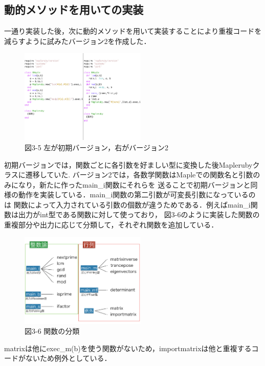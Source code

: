 \subsection{動的メソッドを用いての実装}
一通り実装した後，次に動的メソッドを用いて実装することにより重複コードを減らすように試みたバージョン2を作成した．

\begin{figure}[htbp]\begin{center}
\includegraphics[width=6cm,bb=0 0 442 500]{../figs/./mapleruby_eringi.007.png}
\caption{図3-5 左が初期バージョン，右がバージョン2}
\label{default}\end{center}\end{figure}
初期バージョンでは，関数ごとに各引数を好ましい型に変換した後Maplerubyクラスに遷移していた.
バージョン2では，各数学関数はMapleでの関数名と引数のみになり，新たに作ったmain\_i関数にそれらを
送ることで初期バージョンと同様の動作を実装している．main\_i関数の第二引数が可変長引数になっているのは
関数によって入力されている引数の個数が違うためである．例えばmain\_i関数は出力がint型である関数に対して使っており，
図3-6のように実装した関数の重複部分や出力に応じて分類して，それぞれ関数を追加している．

\begin{figure}[htbp]\begin{center}
\includegraphics[width=6cm,bb=0 0 442 500]{../figs/./mapleruby_eringi.008.png}
\caption{図3-6 関数の分類}
\label{default}\end{center}\end{figure}
matrixは他にexec\_m(b)を使う関数がないため，importmatrixは他と重複するコードがないため例外としている．


